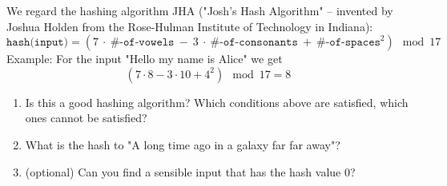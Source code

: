 \documentclass[11pt,a4paper]{report}
\begin{document}
\begin{ex}
We regard the hashing algorithm JHA ("Josh's Hash Algorithm" -- invented by Joshua Holden from the Rose-Hulman Institute of Technology in Indiana): 
\[
\texttt{hash(input)} = (7\ \cdot\ \texttt{\#-of-vowels}\  -\  3\ \cdot \ \texttt{\#-of-consonants}\  +\  \texttt{\#-of-spaces}^2) \mod 17
\]
Example: For the input "Hello my name is Alice" we get
\[
(7\cdot 8 - 3\cdot 10 + 4^2) \mod 17 = 8
\] 
\begin{enumerate}
\item Is this a good hashing algorithm? Which conditions above are satisfied, which ones cannot be satisfied?
\item What is the hash to "A long time ago in a galaxy far far away"?
\item (optional) Can you find a sensible input that has the hash value $0$?
\end{enumerate}
\end{ex}


\newpage
\end{document}
